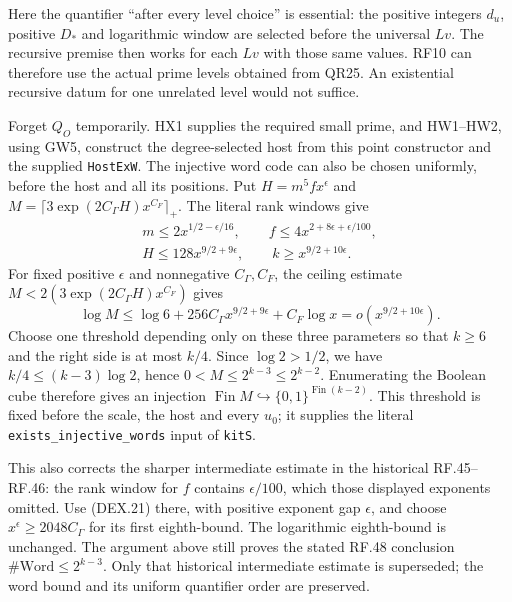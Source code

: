 Here the quantifier ``after every level choice'' is essential:
the positive integers $d_u$, positive $D_*$ and logarithmic window
are selected before the universal $Lv$. The recursive premise
then works for each $Lv$ with those same values. RF10 can therefore
use the actual prime levels obtained from QR25. An existential
recursive datum for one unrelated level would not suffice.

Forget $Q_O$ temporarily. HX1 supplies the required small prime,
and HW1--HW2, using GW5, construct the degree-selected host from
this point constructor and the supplied \texttt{HostExW}.
The injective word code can also be chosen uniformly, before the
host and all its positions. Put $H=m^5f x^\epsilon$ and
$M=\lceil3\exp(2C_\Gamma H)x^{C_F}\rceil_+$. The literal rank
windows give
\[
 \begin{gathered}
 m\le2x^{1/2-\epsilon/16},\qquad
 f\le4x^{2+8\epsilon+\epsilon/100},\\
 H\le128x^{9/2+9\epsilon},\qquad
 k\ge x^{9/2+10\epsilon}.
 \end{gathered}
                                                               \tag{DEX.21}
\]
For fixed positive $\epsilon$ and nonnegative $C_\Gamma,C_F$,
the ceiling estimate $M<2(3\exp(2C_\Gamma H)x^{C_F})$ gives
\[
 \log M\le\log6+256C_\Gamma x^{9/2+9\epsilon}
                         +C_F\log x=o(x^{9/2+10\epsilon}).
                                                               \tag{DEX.22}
\]
Choose one threshold depending only on these three parameters so
that $k\ge6$ and the right side is at most $k/4$. Since
$\log2>1/2$, we have $k/4\le(k-3)\log2$, hence
$0<M\le2^{k-3}\le2^{k-2}$. Enumerating the Boolean cube therefore
gives an injection $\operatorname{Fin}M\hookrightarrow
\{0,1\}^{\operatorname{Fin}(k-2)}$. This threshold is fixed before
the scale, the host and every $u_0$; it supplies the literal
\texttt{exists\_injective\_words} input of \texttt{kitS}.

This also corrects the sharper intermediate estimate in the historical
RF.45--RF.46: the rank window for $f$ contains $\epsilon/100$,
which those displayed exponents omitted. Use (DEX.21) there, with
positive exponent gap $\epsilon$, and choose
$x^\epsilon\ge2048C_\Gamma$ for its first eighth-bound.
The logarithmic eighth-bound is unchanged. The argument above still
proves the stated RF.48 conclusion $\#\mathrm{Word}\le2^{k-3}$.
Only that historical intermediate estimate is superseded; the
word bound and its uniform quantifier order are preserved.

